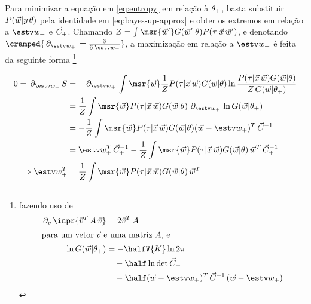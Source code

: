 \newcommand{\del}[1]{\ensuremath{\,\partial_{#1}\,}}
\newcommand{\delwT}{\ensuremath{\del{\wT}}}
\newcommand{\lkl}{\ensuremath{P(\tau|\vec{x}\,\rl)}}
\newcommand{\gt}{\ensuremath{G(\rl|\At)}}
\newcommand{\gT}{\ensuremath{G(\rl|\AT)}} \newcommand{\partf}{Z} Para minimizar
a equação em \eqref{eq:entropy} em relação à $\theta_+$, basta substituir
$P(\vec{w}|y\,\theta)$ pela identidade em \eqref{eq:bayes-up-approx} e obter os
extremos em relação a $\wT$ e $\vec{C}_+$.  Chamando $\partf=\int
\msr{\rl'}G(\rl'|\At)P(\tau|\vec{x}\,\rl')$, e denotando $\cramped{\delwT =
  \frac{\partial}{\partial\,\wT}}$, a maximização em relação a $\wT$ é feita da
seguinte forma
\footnote{fazendo uso de
\begin{align*}
    \del{v} \inpr{\vec{v}^T\,A\,\vec{v}} & = 2\vec{v}^T\,A \\
    \intertext{para um vetor $\vec{v}$ e uma matriz $A$, e}
    \ln G(\rl|\AT) & = -\halfV{K}\ln2\pi \\
                   & \quad -\half\ln\det \CT \\
                   & \quad -\half (\rl-\wT)^T\,\CT^{-1}\,(\rl-\wT)
\end{align*}
}

\begin{align}\label{eq:max-ent-w}
    0 = \delwT S & = -\delwT\int\msr{\rl}\frac{1}{\partf}\lkl\gt\ln\frac{\lkl\gt}{\partf\,\gT} \notag \\
    & = \frac{1}{\partf}\int\msr{\rl}\lkl\gt\,\delwT\ln\gT \notag \\
    & = -\frac{1}{\partf}\int\msr{\rl}\lkl\gt(\rl-\wT)^T\,\CT^{-1} \notag \\
    & = \wT^T\,\CT^{-1} - \frac{1}{\partf}\int\msr{\rl}\lkl\gt\,\rl^T\,\CT^{-1} \notag \\
    \Rightarrow \wT^T & = \frac{1}{\partf}\int\msr{\rl}\lkl\gt\,\rl^T
\end{align}

